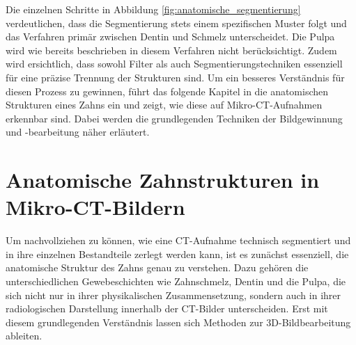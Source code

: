 Die einzelnen Schritte in Abbildung \ref{fig:anatomische_segmentierung}
verdeutlichen, dass die Segmentierung stets einem spezifischen Muster folgt und das
Verfahren primär zwischen Dentin und Schmelz unterscheidet. Die Pulpa wird wie
bereits beschrieben in diesem Verfahren nicht berücksichtigt. Zudem wird ersichtlich,
dass sowohl Filter als auch Segmentierungstechniken essenziell für eine präzise
Trennung der Strukturen sind. Um ein besseres Verständnis für diesen Prozess zu gewinnen,
führt das folgende Kapitel in die anatomischen Strukturen eines Zahns ein und
zeigt, wie diese auf Mikro-\ac{CT}-Aufnahmen erkennbar sind. Dabei werden die grundlegenden
Techniken der Bildgewinnung und -bearbeitung näher erläutert.

\pagebreak

\section{Anatomische Zahnstrukturen in Mikro-CT-Bildern}
\label{sec:domänenspezifisch} Um nachvollziehen zu können, wie eine \ac{CT}-Aufnahme
technisch segmentiert und in ihre einzelnen Bestandteile zerlegt werden kann,
ist es zunächst essenziell, die anatomische Struktur des Zahns genau zu verstehen.
Dazu gehören die unterschiedlichen Gewebeschichten wie Zahnschmelz, Dentin und die
Pulpa, die sich nicht nur in ihrer physikalischen Zusammensetzung, sondern auch in
ihrer radiologischen Darstellung innerhalb der \ac{CT}-Bilder unterscheiden. Erst
mit diesem grundlegenden Verständnis lassen sich Methoden zur \ac{3D}-Bildbearbeitung
ableiten.

